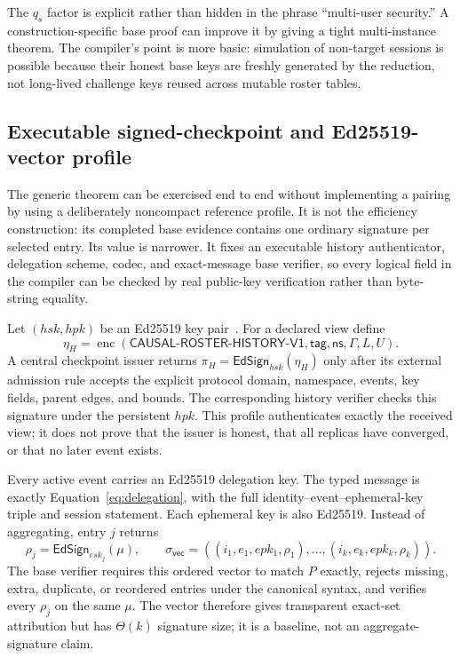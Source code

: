 \documentclass[11pt]{article}
\theoremstyle{definition}
\newcommand{\enc}{\operatorname{enc}}
\begin{document}
The $q_s$ factor is explicit rather than hidden in the phrase ``multi-user security.''  A construction-specific base proof can improve it by giving a tight multi-instance theorem.  The compiler's point is more basic: simulation of non-target sessions is possible because their honest base keys are freshly generated by the reduction, not long-lived challenge keys reused across mutable roster tables.


\subsection{Executable signed-checkpoint and Ed25519-vector profile}\label{subsec:ed25519-reference}
The generic theorem can be exercised end to end without implementing a pairing by using a deliberately noncompact reference profile.  It is not the efficiency construction: its completed base evidence contains one ordinary signature per selected entry.  Its value is narrower.  It fixes an executable history authenticator, delegation scheme, codec, and exact-message base verifier, so every logical field in the compiler can be checked by real public-key verification rather than byte-string equality.

Let $(hsk,hpk)$ be an Ed25519 key pair~\cite{bernstein2012ed25519}.  For a declared view define
\[
 \eta_H=\enc(\mathsf{CAUSAL\mbox{-}ROSTER\mbox{-}HISTORY\mbox{-}V1},
        \mathsf{tag},\mathsf{ns},\Gamma,L,U).
\]
A central checkpoint issuer returns $\pi_H=\mathsf{EdSign}_{hsk}(\eta_H)$ only after its external admission rule accepts the explicit protocol domain, namespace, events, key fields, parent edges, and bounds.  The corresponding history verifier checks this signature under the persistent $hpk$.  This profile authenticates exactly the received view; it does not prove that the issuer is honest, that all replicas have converged, or that no later event exists.

Every active event carries an Ed25519 delegation key.  The typed message is exactly Equation~\eqref{eq:delegation}, with the full identity--event--ephemeral-key triple and session statement.  Each ephemeral key is also Ed25519.  Instead of aggregating, entry $j$ returns
\[
   \rho_j=\mathsf{EdSign}_{esk_j}(\mu),
   \qquad
   \sigma_{\mathsf{vec}}=((i_1,e_1,epk_1,\rho_1),\ldots,
                          (i_k,e_k,epk_k,\rho_k)).
\]
The base verifier requires this ordered vector to match $P$ exactly, rejects missing, extra, duplicate, or reordered entries under the canonical syntax, and verifies every $\rho_j$ on the same $\mu$.  The vector therefore gives transparent exact-set attribution but has $\Theta(k)$ signature size; it is a baseline, not an aggregate-signature claim.
\end{document}

